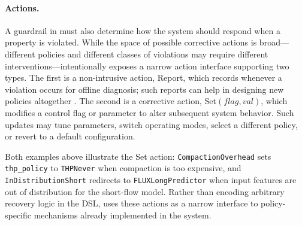 \paragraph{Actions.}
A guardrail in \lang must also determine how the system should respond when a property is violated.
While the space of possible corrective actions is broad---different policies and different classes of violations may require different interventions---\lang intentionally exposes a narrow action interface supporting two types.
The first is a non-intrusive action, {\sf Report}, which records whenever a violation occurs for offline diagnosis; such reports can help in designing new policies altogether .
The second is a corrective action, {\sf Set}$(flag, val)$, which modifies a control flag or parameter to alter subsequent system behavior.
Such updates may tune parameters, switch operating modes, select a different policy, or revert to a default configuration.

Both examples above illustrate the {\sf Set} action: {\tt CompactionOverhead} sets {\tt thp\_policy} to {\tt THPNever} when compaction is too expensive, and {\tt InDistributionShort} redirects to {\tt FLUXLongPredictor} when input features are out of distribution for the short-flow model.
Rather than encoding arbitrary recovery logic in the DSL, \lang uses these actions as a narrow interface to policy-specific mechanisms already implemented in the system.

